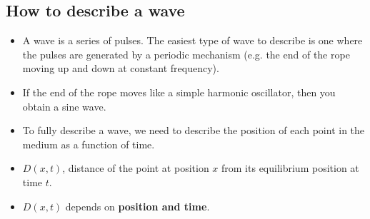 \documentclass[aspectratio=169,
hyperref={colorlinks,urlcolor=blue}
]{beamer}
\begin{document}
\begin{frame}
\titlepage
\thispagestyle{empty}
\end{frame}

\subsection{How to describe a wave}
\label{subsec:howtodescribeawave}
{
\begin{itemize}
\item A wave is a series of pulses. The easiest type of wave to describe is one where the pulses are generated by a periodic mechanism (e.g. the end of the rope moving up and down at constant frequency). 
\item If the end of the rope moves like a simple harmonic oscillator, then you obtain a sine wave. 
\item[$\rightarrow$] To fully describe a wave, we need to describe the position of each point in the medium as a function of time.
\item[$\rightarrow$] $D(x,t)$, distance of the point at position $x$ from its equilibrium position at time $t$.
\item[$\rightarrow$] $D(x,t)$ depends on \textbf{position and time}.

\end{itemize}

}
\end{document}
